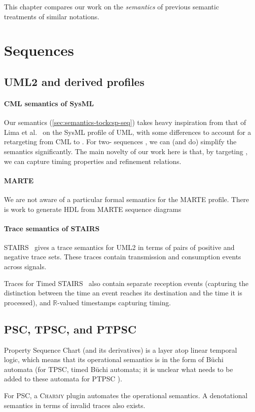 
This chapter compares our work on the \emph{semantics} of \langname{}
previous semantic treatments of similar notations.

\section{Sequences}\label{sec:semantics-review-seq}

\subsection{UML2 and derived profiles}

\paragraph{CML semantics of SysML}

Our semantics (\cref{sec:semantics-tockcsp-seq}) takes heavy inspiration from
that of Lima et al.~\cite{lima-semantics} on the SysML profile of UML, with
some differences to account for a retargeting from CML to \tockcsp.  For
two-\mactor{} sequences , we can (and do)
simplify the semantics significantly.
The main novelty of our work here is that, by targeting \tockcsp, we can capture
timing properties and refinement relations.

\paragraph{MARTE}

We are not aware of a particular formal semantics for the MARTE profile.
There is work to generate HDL from MARTE sequence diagrams~

\paragraph{Trace semantics of STAIRS}

STAIRS~\cite{Haugen03-STAIRS} gives a trace semantics for UML2 in terms
of pairs of positive and negative trace sets.  These traces contain
transmission and consumption events across signals.

Traces for Timed
STAIRS~\cite{Haugen05-TimedSTAIRS} also contain separate reception
events (capturing the distinction between the time an event reaches
its destination and the time it is processed), and \(\mathbb R\)-valued
timestamps capturing timing.

\subsection{PSC, TPSC, and PTPSC}

Property Sequence Chart (and its derivatives) is a layer atop
linear temporal logic, which means that its operational semantics is
in the form of B\"uchi automata (for TPSC, timed B\"uchi
automata; it is unclear what needs to be added to these automata for PTPSC ).

For PSC, a \textsc{Charmy} plugin automates the operational semantics.  A denotational semantics in terms of
invalid traces also exists.